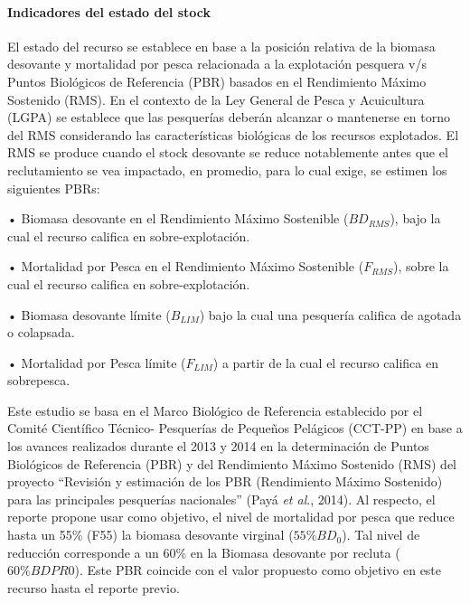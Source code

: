 \documentclass[
  spanish,
]{article}
\begin{document}
\hypertarget{indicadores-del-estado-del-stock}{%
\paragraph{Indicadores del estado del
stock}\label{indicadores-del-estado-del-stock}}

\quad

El estado del recurso se establece en base a la posición relativa de la
biomasa desovante y mortalidad por pesca relacionada a la explotación
pesquera v/s Puntos Biológicos de Referencia (PBR) basados en el
Rendimiento Máximo Sostenido (RMS). En el contexto de la Ley General de
Pesca y Acuicultura (LGPA) se establece que las pesquerías deberán
alcanzar o mantenerse en torno del RMS considerando las características
biológicas de los recursos explotados. El RMS se produce cuando el stock
desovante se reduce notablemente antes que el reclutamiento se vea
impactado, en promedio, para lo cual exige, se estimen los siguientes
PBRs:

• Biomasa desovante en el Rendimiento Máximo Sostenible (\(BD_{RMS}\)),
bajo la cual el recurso califica en sobre-explotación.

• Mortalidad por Pesca en el Rendimiento Máximo Sostenible
(\(F_{RMS}\)), sobre la cual el recurso califica en sobre-explotación.

• Biomasa desovante límite (\(B_{LIM}\)) bajo la cual una pesquería
califica de agotada o colapsada.

• Mortalidad por Pesca límite (\(F_{LIM}\)) a partir de la cual el
recurso califica en sobrepesca.

\vspace{0.8cm}

Este estudio se basa en el Marco Biológico de Referencia establecido por
el Comité Científico Técnico- Pesquerías de Pequeños Pelágicos (CCT-PP)
en base a los avances realizados durante el 2013 y 2014 en la
determinación de Puntos Biológicos de Referencia (PBR) y del Rendimiento
Máximo Sostenido (RMS) del proyecto ``Revisión y estimación de los PBR
(Rendimiento Máximo Sostenido) para las principales pesquerías
nacionales'' (Payá \emph{et al}., 2014). Al respecto, el reporte propone
usar como objetivo, el nivel de mortalidad por pesca que reduce hasta un
55\% (F55) la biomasa desovante virginal (\(55\%BD_0\)). Tal nivel de
reducción corresponde a un 60\% en la Biomasa desovante por recluta
(\(60\%BDPR0\)). Este PBR coincide con el valor propuesto como objetivo
en este recurso hasta el reporte previo.
\end{document}
